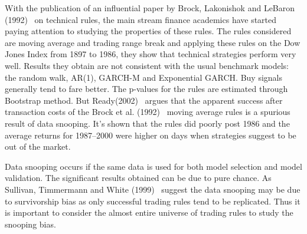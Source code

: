 With the publication of an influential paper by Brock, Lakonishok and LeBaron (1992)~\cite{BLL} on technical rules, the main stream finance academics have started paying attention to studying the properties of these rules. The rules considered are moving average and trading range break and applying these rules on the Dow Jones Index from 1897 to 1986, they show that technical strategies perform very well. Results they obtain are not consistent with the usual benchmark models: the random walk, AR(1), GARCH-M and Exponential GARCH. Buy signals generally tend to fare better. The p-values for the rules are estimated through Bootstrap method. But Ready(2002)~\cite{ready} argues that the apparent success after transaction costs of the Brock et al. (1992)~\cite{BLL} moving average rules is a spurious result of data snooping. It's shown that the rules did poorly post 1986 and the average returns for 1987--2000 were higher on days when strategies suggest to be out of the market.


Data snooping occurs if the same data is used for both model selection and model validation. The significant results obtained can be due to pure chance. As Sullivan, Timmermann and White (1999)~\cite{sullivan1999data} suggest the data snooping may be due to survivorship bias as only successful trading rules tend to be replicated. Thus it is important to consider the almost entire universe of trading rules to study the snooping bias.


